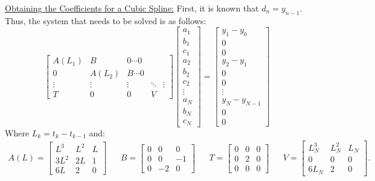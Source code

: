 \documentclass{article}
\begin{document}
\underline{Obtaining the Coefficients for a Cubic Spline:}
First, it is known that $d_n = y_{n-1}$. Thus, the system that needs to be solved is
as follows:
\[
    \begin{bmatrix}
        A(L_1) & B & 0 \cdots 0\\
        0 & A(L_2) & B \cdots 0\\
        \vdots & \vdots & \vdots & \ddots & \vdots\\
        T & 0 & 0 & V
    \end{bmatrix}
    \begin{bmatrix}
        a_1\\
        b_1\\
        c_1\\
        a_2\\
        b_2\\
        c_2\\
        \vdots\\
        a_N\\
        b_N\\
        c_N
    \end{bmatrix}
    =
    \begin{bmatrix}
        y_1 - y_0 \\
        0\\
        0\\
        y_2 - y_1\\
        0\\
        0\\
        \vdots\\
        y_N - y_{N-1}\\
        0\\
        0
    \end{bmatrix}
\]
Where $L_k = t_k - t_{k-1}$ and:
\begin{align*}
    A(L) = \begin{bmatrix}
        L^3 & L^2 & L\\
        3L^2 & 2L & 1\\
        6L & 2 & 0
    \end{bmatrix}
    &&
    B = \begin{bmatrix}
        0 & 0 & 0\\
        0 & 0 & -1\\
        0 & -2 & 0
    \end{bmatrix}
    &&
    T = \begin{bmatrix}
        0 & 0 & 0\\
        0 & 2 & 0\\
        0 & 0 & 0
    \end{bmatrix}
    &&
    V = \begin{bmatrix}
        L_N^3 & L_N^2 & L_N \\
        0 & 0 & 0\\
        6L_N & 2 & 0
    \end{bmatrix}.
\end{align*}
\end{document}
